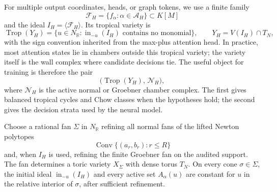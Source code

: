 \documentclass[11pt]{article}
\theoremstyle{definition}
\theoremstyle{plain}
\theoremstyle{remark}
\numberwithin{equation}{section}
\newcommand{\R}{\mathbb{R}}
\newcommand{\Conv}{\operatorname{Conv}}
\begin{document}
For multiple output coordinates, heads, or graph tokens, we use a finite family
\begin{equation}
  \mathcal F_H=\{f_\alpha:\alpha\in\mathcal A_H\}\subset K[M]
\end{equation}
and the ideal $I_H=\langle \mathcal F_H\rangle$.  Its tropical variety is
\begin{equation}
  \operatorname{Trop}(Y_H)
  =
  \{u\in N_\R:\operatorname{in}_{-u}(I_H)\text{ contains no monomial}\},
  \qquad Y_H=V(I_H)\cap T_N,
\end{equation}
with the sign convention inherited from the max-plus attention head.  In practice, most attention states lie in chambers outside this tropical variety; the variety itself is the wall complex where candidate decisions tie.  The useful object for training is therefore the pair
\begin{equation}
  \bigl(\operatorname{Trop}(Y_H),\,\mathcal N_H\bigr),
\end{equation}
where $\mathcal N_H$ is the active normal or Groebner chamber complex.  The first gives balanced tropical cycles and Chow classes when the hypotheses hold; the second gives the decision strata used by the neural model.

Choose a rational fan $\Sigma$ in $N_\R$ refining all normal fans of the lifted Newton polytopes
\begin{equation}
  \Conv\{(a_r,b_r):r\le R\}
\end{equation}
and, when $I_H$ is used, refining the finite Groebner fan on the audited support.  The fan determines a toric variety $X_\Sigma$ with dense torus $T_N$.  On every cone $\sigma\in\Sigma$, the initial ideal $\operatorname{in}_{-u}(I_H)$ and every active set $A_\alpha(u)$ are constant for $u$ in the relative interior of $\sigma$, after sufficient refinement.
\end{document}
